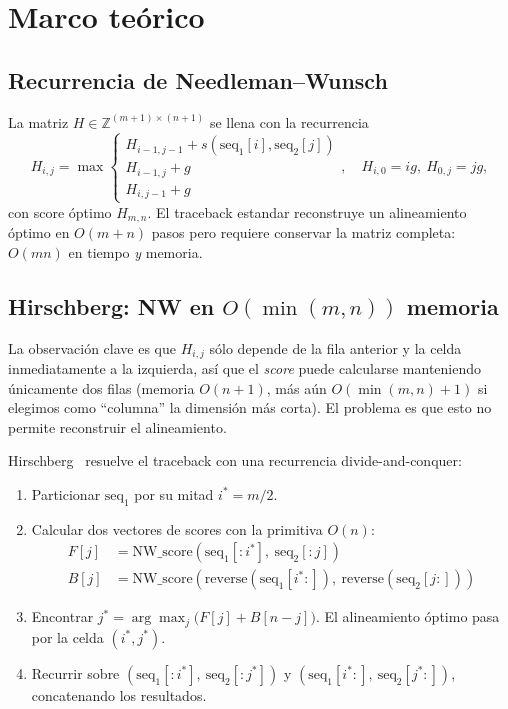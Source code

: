 \documentclass[11pt,a4paper]{article}
\begin{document}
\section{Marco te\'orico}

\subsection{Recurrencia de Needleman--Wunsch}
La matriz $H \in \mathbb{Z}^{(m+1)\times(n+1)}$ se llena con la recurrencia
\begin{equation}
H_{i,j} = \max \begin{cases}
H_{i-1,j-1} + s(\text{seq}_1[i],\text{seq}_2[j]) \\
H_{i-1,j} + g \\
H_{i,j-1} + g
\end{cases}, \quad H_{i,0}=ig,\ H_{0,j}=jg,
\label{eq:nw}
\end{equation}
con score \'optimo $H_{m,n}$. El traceback estandar reconstruye un alineamiento \'optimo en $O(m+n)$ pasos pero requiere conservar la matriz completa: $O(mn)$ en tiempo \emph{y} memoria.

\subsection{Hirschberg: NW en $O(\min(m,n))$ memoria}
La observaci\'on clave es que $H_{i,j}$ s\'olo depende de la fila anterior y la celda inmediatamente a la izquierda, as\'i que el \emph{score} puede calcularse manteniendo \'unicamente dos filas (memoria $O(n+1)$, m\'as a\'un $O(\min(m,n)+1)$ si elegimos como ``columna'' la dimensi\'on m\'as corta). El problema es que esto no permite reconstruir el alineamiento.

Hirschberg~\cite{hirschberg1975} resuelve el traceback con una recurrencia divide-and-conquer:

\begin{enumerate}
\item Particionar $\text{seq}_1$ por su mitad $i^* = m/2$.
\item Calcular dos vectores de scores con la primitiva $O(n)$:
\begin{align*}
F[j] &= \mathrm{NW\_score}(\text{seq}_1[:i^*],\ \text{seq}_2[:j]) \\
B[j] &= \mathrm{NW\_score}(\text{reverse}(\text{seq}_1[i^*:]),\ \text{reverse}(\text{seq}_2[j:]))
\end{align*}
\item Encontrar $j^* = \arg\max_{j}\bigl(F[j] + B[n-j]\bigr)$. El alineamiento \'optimo pasa por la celda $(i^*, j^*)$.
\item Recurrir sobre $(\text{seq}_1[:i^*],\ \text{seq}_2[:j^*])$ y $(\text{seq}_1[i^*:],\ \text{seq}_2[j^*:])$, concatenando los resultados.
\end{enumerate}
\end{document}
